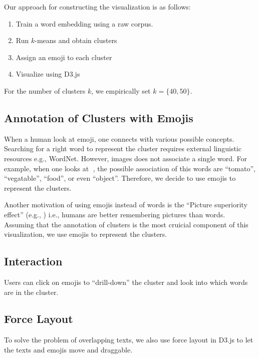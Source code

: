 Our approach for constructing the visualization is as follows:
\begin{enumerate}
 \item Train a word embedding using a raw corpus. 
 \item Run $k$-means \cite{lloyd1982least} and obtain clusters
 \item Assign an emoji to each cluster
 \item Visualize using D3.js
\end{enumerate}
For the number of clusters $k$, we empirically set $k = \{40, 50\}$.

\subsection{Annotation of Clusters with Emojis}
When a human look at emoji, one connects with various possible concepts. 
Searching for a right word to represent the cluster requires external linguistic resources e.g., WordNet. 
However, images does not associate a single word. 
For example, when one looks at 🍅, the possible association of this words are ``tomato'', ``vegatable'', ``food'', or even ``object''. 
Therefore, we decide to use emojis to represent the clusters. 

Another motivation of using emojis instead of words is the ``Picture superiority effect'' (e.g., \cite{doi:10.1162/jocn.2010.21464}) i.e., humans are better remembering pictures than words. 
Assuming that the annotation of clusters is the most cruicial component of this visualization, we use emojis to represent the clusters.  


\subsection{Interaction}
Users can click on emojis to ``drill-down'' \cite{Elmqvist:2010:HAI:1749404.1749525} the cluster and look into which words are in the cluster.


\subsection{Force Layout}
To solve the problem of overlapping texts, we also use force layout in D3.js to let the texts and emojis move and draggable. 
